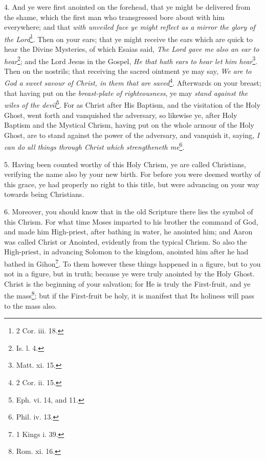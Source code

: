 4. And ye were first anointed on the forehead, that ye might be delivered from the shame, which the first man who transgressed bore about with him everywhere; and that \emph{with unveiled face ye might reflect as a mirror the glory of the Lord}\footnote{2 Cor. iii. 18.}. Then on your ears; that ye might receive the ears which are quick to hear the Divine Mysteries, of which Esaias said, \emph{The Lord gave me also an ear to hear}\footnote{Is. l. 4.}; and the Lord Jesus in the Gospel, \emph{He that hath ears to hear let him hear}\footnote{Matt. xi. 15.}. Then on the nostrils; that receiving the sacred ointment ye may say, \emph{We are to God a sweet savour of Christ, in them that are saved}\footnote{2 Cor. ii. 15.}. Afterwards on your breast; that having put on the \emph{breast-plate of righteousness}, ye may \emph{stand against the wiles of the devil}\footnote{Eph. vi. 14, and 11.}. For as Christ after His Baptism, and the visitation of the Holy Ghost, went forth and vanquished the adversary, so likewise ye, after Holy Baptism and the Mystical Chrism, having put on the whole armour of the Holy Ghost, are to stand against the power of the adversary, and vanquish it, saying, \emph{I can do all things through Christ which strengtheneth me}\footnote{Phil. iv. 13.}.

5. Having been counted worthy of this Holy Chrism, ye are called Christians, verifying the name also by your new birth. For before you were deemed worthy of this grace, ye had properly no right to this title, but were advancing on your way towards being Christians.

6. Moreover, you should know that in the old Scripture there lies the symbol of this Chrism. For what time Moses imparted to his brother the command of God, and made him High-priest, after bathing in water, he anointed him; and Aaron was called Christ or Anointed, evidently from the typical Chrism. So also the High-priest, in advancing Solomon to the kingdom, anointed him after he had bathed in Gihon\footnote{1 Kings i. 39.}. To them however these things happened in a figure, but to you not in a figure, but in truth; because ye were truly anointed by the Holy Ghost. Christ is the beginning of your salvation; for He is truly the First-fruit, and ye the mass\footnote{Rom. xi. 16.}; but if the First-fruit be holy, it is manifest that Its holiness will pass to the mass also.

